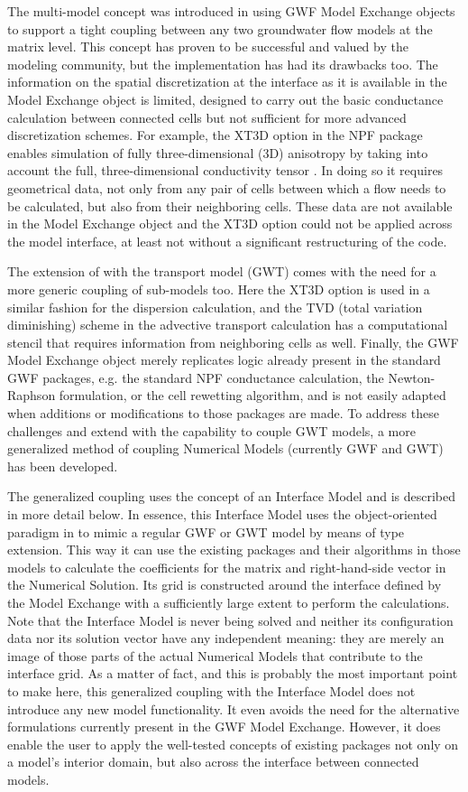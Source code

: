 The multi-model concept was introduced in \mf using GWF Model Exchange objects to support a tight coupling between any two groundwater flow models at the matrix level. This concept has proven to be successful and valued by the modeling community, but the implementation has had its drawbacks too. The information on the spatial discretization at the interface as it is available in the Model Exchange object is limited, designed to carry out the basic conductance calculation between connected cells but not sufficient for more advanced discretization schemes. For example, the XT3D option in the NPF package enables simulation of fully three-dimensional (3D) anisotropy by taking into account the full, three-dimensional conductivity tensor \cite{modflow6xt3d}. In doing so it requires geometrical data, not only from any pair of cells between which a flow needs to be calculated, but also from their neighboring cells. These data are not available in the Model Exchange object and the XT3D option could not be applied across the model interface, at least not without a significant restructuring of the code.

The extension of \mf with the transport model (GWT) comes with the need for a more generic coupling of sub-models too. Here the XT3D option is used in a similar fashion for the dispersion calculation, and the TVD (total variation diminishing) scheme in the advective transport calculation has a computational stencil that requires information from neighboring cells as well. Finally, the GWF Model Exchange object merely replicates logic already present in the standard GWF packages, e.g. the standard NPF conductance calculation, the Newton-Raphson formulation, or the cell rewetting algorithm, and is not easily adapted when additions or modifications to those packages are made. To address these challenges and extend \mf with the capability to couple GWT models, a more generalized method of coupling Numerical Models (currently GWF and GWT) has been developed.

The generalized coupling uses the concept of an Interface Model and is described in more detail below. In essence, this Interface Model uses the object-oriented paradigm in \mf to mimic a regular GWF or GWT model by means of type extension. This way it can use the existing packages and their algorithms in those models to calculate the coefficients for the matrix and right-hand-side vector in the Numerical Solution. Its grid is constructed around the interface defined by the Model Exchange with a sufficiently large extent to perform the calculations. Note that the Interface Model is never being solved and neither its configuration data nor its solution vector have any independent meaning: they are merely an image of those parts of the actual Numerical Models that contribute to the interface grid. As a matter of fact, and this is probably the most important point to make here, this generalized coupling with the Interface Model does not introduce any new model functionality. It even avoids the need for the alternative formulations currently present in the GWF Model Exchange. However, it does enable the user to apply the well-tested concepts of existing \mf packages not only on a model’s interior domain, but also across the interface between connected models.
  
